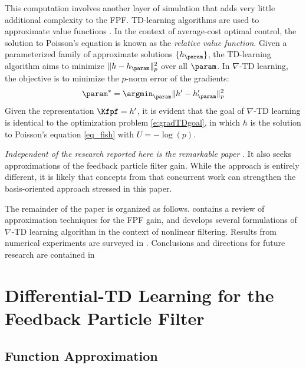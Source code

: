 This computation involves another layer of simulation that adds very little additional complexity to the FPF. 
TD-learning algorithms are used to approximate value functions \cite{bertsi96a}.  In the context of average-cost optimal control,  the solution to Poisson's equation is known as the \textit{relative value function}.   Given a parameterized family of approximate solutions $\{h_\param\}$,  the TD-learning algorithm aims to minimize $\| h - h_\param\|_p^{2}$ over all $\param$. In $\nabla$-TD learning, the objective is to minimize the $p$-norm error of the gradients:
\begin{equation}
\param^* = \argmin_{\param} \| h' - h_\param'\|_p^{2}
\label{e:gradTDobjective}
\end{equation}
Given the representation $\Kfpf = h' $,  it is evident that the goal of $\nabla$-TD learning
is identical to the optimization problem \eqref{e:gradTDgoal}, in which $h$ is the solution to Poisson's equation \eqref{eq_fish} with $U=-\log(p)$.



\textit{Independent of the research reported here is the remarkable paper \cite{tagmeh16}}.  It also seeks approximations of the  feedback particle filter gain. While the approach is entirely different,   it is likely that concepts from that concurrent work can strengthen the basis-oriented approach stressed in this paper.  



The remainder of the paper is organized as follows.     contains a review of approximation techniques for the FPF gain,  and develops several formulations of  $\nabla$-TD learning algorithm in the context of nonlinear filtering.   Results from numerical experiments are surveyed in .    Conclusions and directions for future research are contained in 


\section{Differential-TD Learning for the Feedback Particle Filter}
\label{section_learning}


\subsection{Function Approximation}


